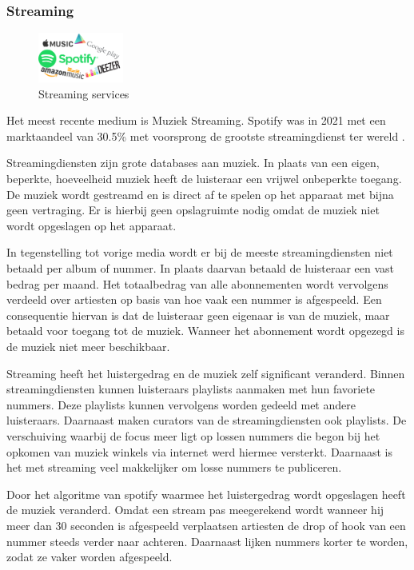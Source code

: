 \subsubsection*{Streaming}
\begin{figure}
    \centering
    \includegraphics[width=0.25\textwidth]{assets/critical-review/StreamingServices.png}
    \caption{Streaming services}
    \label{fig:critical-review:StreamingServices}
\end{figure}

Het meest recente medium is Muziek Streaming. Spotify was in 2021 met een marktaandeel van 30.5\% met voorsprong de grootste streamingdienst ter wereld \citep{mulligan2022marketshares}.

Streamingdiensten zijn grote databases aan muziek. In plaats van een eigen, beperkte, hoeveelheid muziek heeft de luisteraar een vrijwel onbeperkte toegang. De muziek wordt gestreamd en is direct af te spelen op het apparaat met bijna geen vertraging. Er is hierbij geen opslagruimte nodig omdat de muziek niet wordt opgeslagen op het apparaat.

In tegenstelling tot vorige media wordt er bij de meeste streamingdiensten niet betaald per album of nummer. In plaats daarvan betaald de luisteraar een vast bedrag per maand. Het totaalbedrag van alle abonnementen wordt vervolgens verdeeld over artiesten op basis van hoe vaak een nummer is afgespeeld. Een consequentie hiervan is dat de luisteraar geen eigenaar is van de muziek, maar betaald voor toegang tot de muziek. Wanneer het abonnement wordt opgezegd is de muziek niet meer beschikbaar. 

Streaming heeft het luistergedrag en de muziek zelf significant veranderd. Binnen streamingdiensten kunnen luisteraars playlists aanmaken met hun favoriete nummers. Deze playlists kunnen vervolgens worden gedeeld met andere luisteraars. Daarnaast maken curators van de streamingdiensten ook playlists. De verschuiving waarbij de focus meer ligt op lossen nummers die begon bij het opkomen van muziek winkels via internet werd hiermee versterkt. Daarnaast is het met streaming veel makkelijker om losse nummers te publiceren.

Door het algoritme van spotify waarmee het luistergedrag wordt opgeslagen heeft de muziek veranderd. Omdat een stream pas meegerekend wordt wanneer hij meer dan 30 seconden is afgespeeld verplaatsen artiesten de drop of hook van een nummer steeds verder naar achteren. Daarnaast lijken nummers korter te worden, zodat ze vaker worden afgespeeld.

